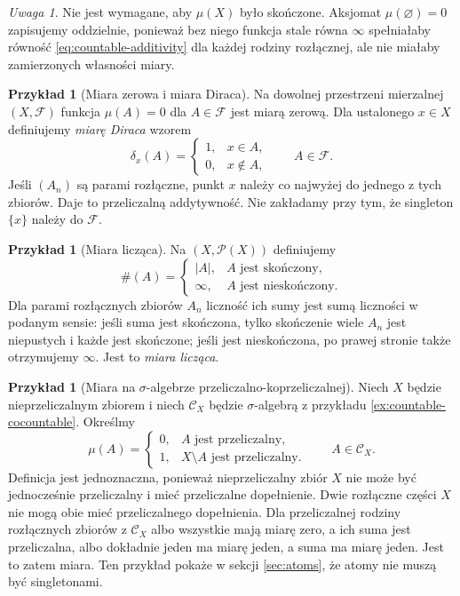 \documentclass[11pt,a4paper,oneside]{book}
\numberwithin{equation}{chapter}
\theoremstyle{plain}
\theoremstyle{definition}
\newtheorem{przyklad}[twierdzenie]{Przykład}
\theoremstyle{remark}
\newtheorem{uwaga}[twierdzenie]{Uwaga}
\begin{document}
\begin{uwaga}
Nie jest wymagane, aby $\mu(X)$ było skończone. Aksjomat
$\mu(\varnothing)=0$ zapisujemy oddzielnie, ponieważ bez niego
funkcja stale równa $\infty$ spełniałaby równość
\eqref{eq:countable-additivity} dla każdej rodziny rozłącznej,
ale nie miałaby zamierzonych własności miary.
\end{uwaga}

\begin{przyklad}[Miara zerowa i miara Diraca]
\label{ex:dirac}
Na dowolnej przestrzeni mierzalnej $(X,\mathcal F)$ funkcja
$\mu(A)=0$ dla $A\in\mathcal F$ jest miarą zerową.
Dla ustalonego $x\in X$ definiujemy \emph{miarę Diraca} wzorem
\[
\delta_x(A)=\begin{cases}1,&x\in A,\\0,&x\notin A,\end{cases}
\qquad A\in\mathcal F.
\]
Jeśli $(A_n)$ są parami rozłączne, punkt $x$ należy co najwyżej
do jednego z tych zbiorów. Daje to przeliczalną addytywność.
Nie zakładamy przy tym, że singleton $\{x\}$ należy do $\mathcal F$.
\end{przyklad}

\begin{przyklad}[Miara licząca]
\label{ex:counting}
Na $(X,\mathcal P(X))$ definiujemy
\[
\#(A)=\begin{cases}
|A|,&A\text{ jest skończony},\\
\infty,&A\text{ jest nieskończony}.
\end{cases}
\]
Dla parami rozłącznych zbiorów $A_n$ liczność ich sumy jest sumą
liczności w podanym sensie: jeśli suma jest skończona, tylko
skończenie wiele $A_n$ jest niepustych i każde jest skończone;
jeśli jest nieskończona, po prawej stronie także otrzymujemy
$\infty$. Jest to \emph{miara licząca}.
\end{przyklad}

\begin{przyklad}[Miara na $\sigma$-algebrze przeliczalno-koprzeliczalnej]
\label{ex:cocountable-measure}
Niech $X$ będzie nieprzeliczalnym zbiorem i niech
$\mathcal C_X$ będzie $\sigma$-algebrą z przykładu
\ref{ex:countable-cocountable}. Określmy
\[
\mu(A)=\begin{cases}
0,&A\text{ jest przeliczalny},\\
1,&X\setminus A\text{ jest przeliczalny}.
\end{cases}
\qquad A\in\mathcal C_X.
\]
Definicja jest jednoznaczna, ponieważ nieprzeliczalny zbiór
$X$ nie może być jednocześnie przeliczalny i mieć przeliczalne
dopełnienie. Dwie rozłączne części $X$ nie mogą obie mieć
przeliczalnego dopełnienia. Dla przeliczalnej rodziny
rozłącznych zbiorów z $\mathcal C_X$ albo wszystkie mają miarę
zero, a ich suma jest przeliczalna, albo dokładnie jeden ma
miarę jeden, a suma ma miarę jeden. Jest to zatem miara.
Ten przykład pokaże w sekcji \ref{sec:atoms}, że atomy
nie muszą być singletonami.
\end{przyklad}
\end{document}
